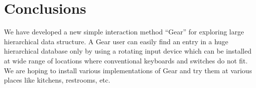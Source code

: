 \documentclass[conference]{IEEEtran}
\begin{document}

\section{Conclusions}

We have developed a new simple interaction method ``Gear'' for exploring
large hierarchical data structure.
A Gear user can easily find an entry in a huge hierarchical database
only by using a rotating input device which can be installed at
wide range of locations where conventional keyboards and switches do not fit.
We are hoping to install various implementations of Gear and try them at
various places like kitchens, restrooms, etc.

\small{


}
\end{document}
